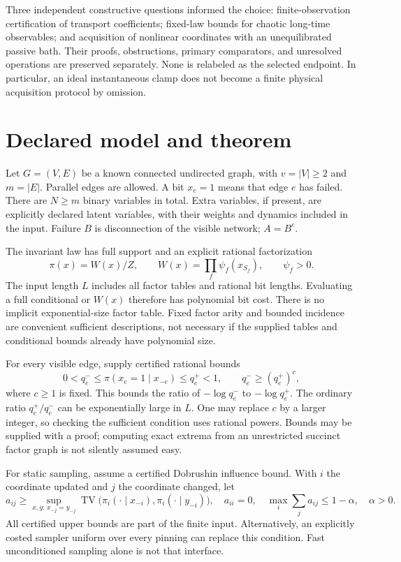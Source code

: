 \documentclass[11pt]{article}
\newcommand{\TV}{\operatorname{TV}}
\begin{document}
Three independent constructive questions informed the choice: finite-observation certification of transport coefficients; fixed-law bounds for chaotic long-time observables; and acquisition of nonlinear coordinates with an unequilibrated passive bath. Their proofs, obstructions, primary comparators, and unresolved operations are preserved separately. None is relabeled as the selected endpoint. In particular, an ideal instantaneous clamp does not become a finite physical acquisition protocol by omission.

\section{Declared model and theorem}
\label{sec:model}
Let $G=(V,E)$ be a known connected undirected graph, with $v=|V|\ge2$ and $m=|E|$. Parallel edges are allowed. A bit $x_e=1$ means that edge $e$ has failed. There are $N\ge m$ binary variables in total. Extra variables, if present, are explicitly declared latent variables, with their weights and dynamics included in the input. Failure $B$ is disconnection of the visible network; $A=B^c$.

The invariant law has full support and an explicit rational factorization
\begin{equation}
 \pi(x)=W(x)/Z,\qquad W(x)=\prod_f\psi_f(x_{S_f}),\qquad \psi_f>0.
 \label{eq:gibbs}
\end{equation}
The input length $L$ includes all factor tables and rational bit lengths. Evaluating a full conditional or $W(x)$ therefore has polynomial bit cost. There is no implicit exponential-size factor table. Fixed factor arity and bounded incidence are convenient sufficient descriptions, not necessary if the supplied tables and conditional bounds already have polynomial size.

For every visible edge, supply certified rational bounds
\begin{equation}
0<q_e^-\le \pi(x_e=1\mid x_{-e})\le q_e^+<1,
\qquad q_e^-\ge(q_e^+)^c,
\label{eq:contrast}
\end{equation}
where $c\ge1$ is fixed. This bounds the ratio of $-\log q_e^-$ to $-\log q_e^+$. The ordinary ratio $q_e^+/q_e^-$ can be exponentially large in $L$. One may replace $c$ by a larger integer, so checking the sufficient condition uses rational powers. Bounds may be supplied with a proof; computing exact extrema from an unrestricted succinct factor graph is not silently assumed easy.

For static sampling, assume a certified Dobrushin influence bound. With $i$ the coordinate updated and $j$ the coordinate changed, let
\[
 a_{ij}\ge\sup_{x,y:\,x_{-j}=y_{-j}}
 \TV\bigl(\pi_i(\cdot\mid x_{-i}),\pi_i(\cdot\mid y_{-i})\bigr),
 \quad a_{ii}=0,\quad \max_i\sum_j a_{ij}\le1-\alpha,
 \quad\alpha>0.
\]
All certified upper bounds are part of the finite input. Alternatively, an explicitly costed sampler uniform over every pinning can replace this condition. Fast unconditioned sampling alone is not that interface.
\end{document}

